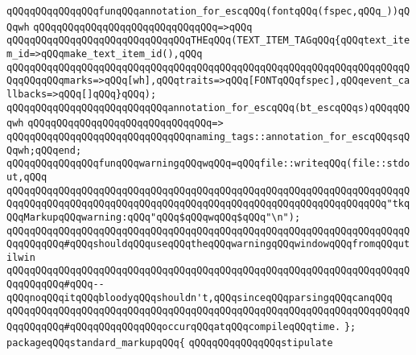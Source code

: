 \newline
\verb|qQQqqQQqqQQqqQQqfunqQQqannotation_for_escqQQq(fontqQQq(fspec,qQQq_))qQQqwh|\newline
\verb|qQQqqQQqqQQqqQQqqQQqqQQqqQQqqQQq=>qQQq|\newline
\verb|qQQqqQQqqQQqqQQqqQQqqQQqqQQqqQQqTHEqQQq(TEXT_ITEM_TAGqQQq{qQQqtext_item_id=>qQQqmake_text_item_id(),qQQq|\newline
\verb|qQQqqQQqqQQqqQQqqQQqqQQqqQQqqQQqqQQqqQQqqQQqqQQqqQQqqQQqqQQqqQQqqQQqqQQqqQQqqQQqmarks=>qQQq[wh],qQQqtraits=>qQQq[FONTqQQqfspec],qQQqevent_callbacks=>qQQq[]qQQq}qQQq);|\newline
\newline
\verb|qQQqqQQqqQQqqQQqqQQqqQQqqQQqannotation_for_escqQQq(bt_escqQQqs)qQQqqQQqwh|\newline
\verb|qQQqqQQqqQQqqQQqqQQqqQQqqQQqqQQq=>|\newline
\verb|qQQqqQQqqQQqqQQqqQQqqQQqqQQqqQQqnaming_tags::annotation_for_escqQQqsqQQqwh;qQQqend;|\newline
\newline
\newline
\verb|qQQqqQQqqQQqqQQqfunqQQqwarningqQQqwqQQq=qQQqfile::writeqQQq(file::stdout,qQQq|\newline
\verb|qQQqqQQqqQQqqQQqqQQqqQQqqQQqqQQqqQQqqQQqqQQqqQQqqQQqqQQqqQQqqQQqqQQqqQQqqQQqqQQqqQQqqQQqqQQqqQQqqQQqqQQqqQQqqQQqqQQqqQQqqQQqqQQqqQQqqQQq"tkqQQqMarkupqQQqwarning:qQQq"qQQq$qQQqwqQQq$qQQq"\n");|\newline
\verb|qQQqqQQqqQQqqQQqqQQqqQQqqQQqqQQqqQQqqQQqqQQqqQQqqQQqqQQqqQQqqQQqqQQqqQQqqQQqqQQq#qQQqshouldqQQquseqQQqtheqQQqwarningqQQqwindowqQQqfromqQQqutilwin|\newline
\verb|qQQqqQQqqQQqqQQqqQQqqQQqqQQqqQQqqQQqqQQqqQQqqQQqqQQqqQQqqQQqqQQqqQQqqQQqqQQqqQQq#qQQq--qQQqnoqQQqitqQQqbloodyqQQqshouldn't,qQQqsinceqQQqparsingqQQqcanqQQq|\newline
\verb|qQQqqQQqqQQqqQQqqQQqqQQqqQQqqQQqqQQqqQQqqQQqqQQqqQQqqQQqqQQqqQQqqQQqqQQqqQQqqQQq#qQQqqQQqqQQqqQQqoccurqQQqatqQQqcompileqQQqtime.|\newline
\newline
\newline
\verb|};|\newline
\newline
\newline
\newline
\verb|packageqQQqstandard_markupqQQq{|\newline
\newline
\verb|qQQqqQQqqQQqqQQqstipulate|\newline
